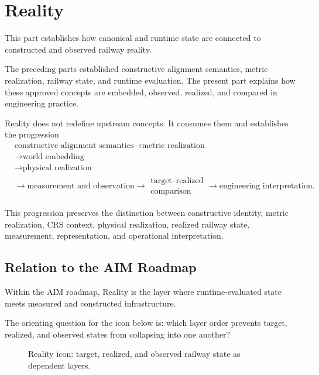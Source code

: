 
\chapter*{Reality}
{}

This part establishes how canonical and runtime state are connected to
constructed and observed railway reality.

The preceding parts established constructive alignment semantics,
metric realization, railway state, and runtime evaluation. The present
part explains how these approved concepts are embedded, observed,
realized, and compared in engineering practice.

Reality does not redefine upstream concepts. It consumes them and
establishes the progression
\[
\begin{aligned}
&\text{constructive alignment semantics}
\rightarrow
\text{metric realization}
\\
&\rightarrow
\text{world embedding}
\\
&\rightarrow
\text{physical realization}
\\
&\rightarrow
\text{measurement and observation}
\rightarrow
\substack{\text{target--realized}\\\text{comparison}}
\rightarrow
\text{engineering interpretation}.
\end{aligned}
\]

This progression preserves the distinction between constructive identity,
metric realization, CRS context, physical realization, realized railway
state, measurement, representation, and operational interpretation.

\section*{Relation to the AIM Roadmap}

Within the AIM roadmap, Reality is the layer where runtime-evaluated
state meets measured and constructed infrastructure.

The orienting question for the icon below is: which layer order prevents
target, realized, and observed states from collapsing into one another?

\begin{figure}[ht]
\centering

\caption{Reality icon: target, realized, and observed railway state as dependent layers.}
\label{fig:icon-reality-target-realized-observed}
\end{figure}

